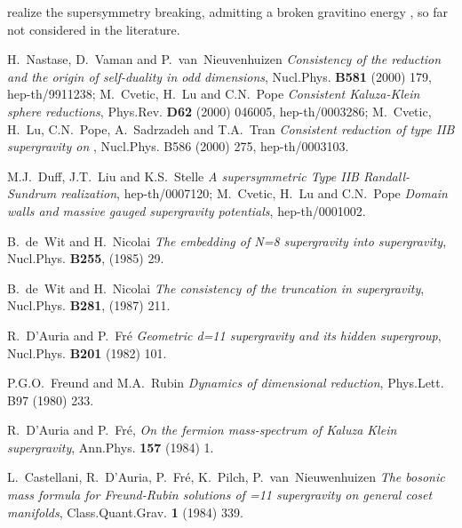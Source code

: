 \documentclass[a4paper,11pt]{article}
\begin{document}
realize the \coordHE{} supersymmetry breaking, admitting a
broken gravitino energy \coordHE{}, so far not considered
in the literature.
%
%
\begin{thebibliography}{99}

H.~Nastase, D.~Vaman and P.~van~Nieuvenhuizen {\it Consistency of
the \coordHE{} reduction and the origin of self-duality in
odd dimensions}, Nucl.Phys. {\bf B581} (2000) 179, hep-th/9911238;
M.~Cvetic, H.~Lu and C.N.~Pope {\it Consistent Kaluza-Klein sphere
reductions}, Phys.Rev. {\bf D62} (2000) 046005, hep-th/0003286;
M.~Cvetic, H.~Lu, C.N.~Pope, A.~Sadrzadeh and T.A.~Tran {\it
Consistent \coordHE{} reduction of type IIB supergravity on \coordHE{}},
Nucl.Phys. {B586} (2000) 275, hep-th/0003103.

M.J.~Duff, J.T.~Liu and K.S.~Stelle {\it A supersymmetric Type IIB
Randall-Sundrum realization}, hep-th/0007120; M.~Cvetic, H.~Lu and
C.N.~Pope {\it Domain walls and massive gauged supergravity
potentials}, hep-th/0001002.

B.~de~Wit and H.~Nicolai {\it The embedding of N=8 supergravity
into \coordHE{} supergravity}, Nucl.Phys. {\bf B255}, (1985) 29.

B.~de~Wit and H.~Nicolai {\it The consistency of the \coordHE{}
truncation in \coordHE{} supergravity}, Nucl.Phys. {\bf B281}, (1987)
211.

R.~D'Auria and P.~Fr\'e {\it Geometric d=11 supergravity and its
hidden supergroup}, Nucl.Phys. {\bf B201} (1982) 101.

P.G.O.~Freund and M.A.~Rubin {\it Dynamics of dimensional
reduction}, Phys.Lett. {B97} (1980) 233.

R.~D'Auria and P.~Fr\'e, {\it On the fermion mass-spectrum of
Kaluza Klein supergravity}, Ann.Phys. {\bf 157} (1984) 1.

L.~Castellani, R.~D'Auria, P.~Fr\'e, K.~Pilch,
P.~van~Nieuwenhuizen {\it The bosonic mass formula for
Freund-Rubin solutions of \coordHE{}=11 supergravity on general coset
manifolds}, Class.Quant.Grav. {\bf 1} (1984) 339.


\end{thebibliography}
\end{document}
